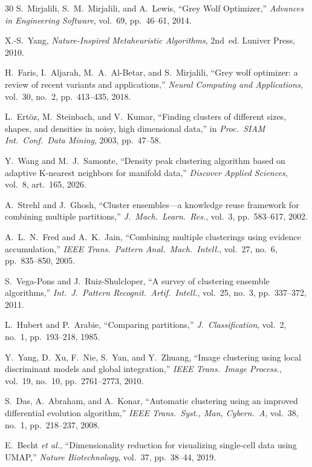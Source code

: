 \documentclass[journal]{IEEEtran}
\begin{document}
\begin{thebibliography}{30}
S.~Mirjalili, S.~M.~Mirjalili, and A.~Lewis, ``Grey Wolf Optimizer,'' \emph{Advances in Engineering Software}, vol.~69, pp.~46--61, 2014.

X.-S.~Yang, \emph{Nature-Inspired Metaheuristic Algorithms}, 2nd~ed. Luniver Press, 2010.

H.~Faris, I.~Aljarah, M.~A.~Al-Betar, and S.~Mirjalili, ``Grey wolf optimizer: a review of recent variants and applications,'' \emph{Neural Computing and Applications}, vol.~30, no.~2, pp.~413--435, 2018.

L.~Ert\"{o}z, M.~Steinbach, and V.~Kumar, ``Finding clusters of different sizes, shapes, and densities in noisy, high dimensional data,'' in \emph{Proc.\ SIAM Int.\ Conf.\ Data Mining}, 2003, pp.~47--58.

Y.~Wang and M.~J.~Samonte, ``Density peak clustering algorithm based on adaptive K-nearest neighbors for manifold data,'' \emph{Discover Applied Sciences}, vol.~8, art.~165, 2026.

A.~Strehl and J.~Ghosh, ``Cluster ensembles---a knowledge reuse framework for combining multiple partitions,'' \emph{J.\ Mach.\ Learn.\ Res.}, vol.~3, pp.~583--617, 2002.

A.~L.~N.~Fred and A.~K.~Jain, ``Combining multiple clusterings using evidence accumulation,'' \emph{IEEE Trans.\ Pattern Anal.\ Mach.\ Intell.}, vol.~27, no.~6, pp.~835--850, 2005.

S.~Vega-Pons and J.~Ruiz-Shulcloper, ``A survey of clustering ensemble algorithms,'' \emph{Int.\ J.\ Pattern Recognit.\ Artif.\ Intell.}, vol.~25, no.~3, pp.~337--372, 2011.

L.~Hubert and P.~Arabie, ``Comparing partitions,'' \emph{J.\ Classification}, vol.~2, no.~1, pp.~193--218, 1985.

Y.~Yang, D.~Xu, F.~Nie, S.~Yan, and Y.~Zhuang, ``Image clustering using local discriminant models and global integration,'' \emph{IEEE Trans.\ Image Process.}, vol.~19, no.~10, pp.~2761--2773, 2010.

S.~Das, A.~Abraham, and A.~Konar, ``Automatic clustering using an improved differential evolution algorithm,'' \emph{IEEE Trans.\ Syst., Man, Cybern.\ A}, vol.~38, no.~1, pp.~218--237, 2008.

E.~Becht \emph{et al.}, ``Dimensionality reduction for visualizing single-cell data using UMAP,'' \emph{Nature Biotechnology}, vol.~37, pp.~38--44, 2019.


\end{thebibliography}
\end{document}
